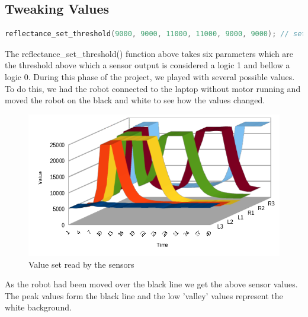 \documentclass[11pt,a4paper,oneside,article]{memoir}
\begin{document}
\subsection{Tweaking Values}
\vspace{-22pt}\begin{lstlisting}[language=C,caption={Reflectance Threshold},label=refthres.c] 
reflectance_set_threshold(9000, 9000, 11000, 11000, 9000, 9000); // set center sensor threshold to 11000 and others to 9000
\end{lstlisting}\vspace{-22pt}
The reflectance\_set\_threshold() function above takes six parameters which are the threshold above which a sensor output is considered a logic 1 and bellow a logic 0. During this phase of the project, we played with several possible values. To do this, we had the robot connected to the laptop without motor running and moved the robot on the black and white to see how the values changed.\\
\begin{figure}[h]
	\centering
	\includegraphics[width=12cm]{illustration/reading_chart}
	\caption[Value set read by the sensors]{Value set read by the sensors}
	\label{fig:readingchart}
\end{figure}
As the robot had been moved over the black line we get the above sensor values. The peak values form the black line and the low 'valley' values represent the white background.
\end{document}
